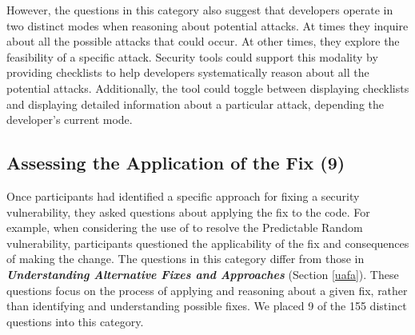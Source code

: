 \documentclass[conference]{IEEEtran}
\begin{document}
However, the questions in this category also suggest that developers operate in two distinct modes when reasoning about potential attacks.
At times they inquire about all the possible attacks that could occur.
At other times, they explore the feasibility of a specific attack.
Security tools could support this modality by providing checklists to help developers systematically reason about all the potential attacks. 
Additionally, the tool could toggle between displaying checklists and displaying detailed information about a particular attack, depending the developer's current mode.



\noindent\subsection{\textbf{Assessing the Application of the Fix (9)}}\label{aaf}
Once participants had identified a specific approach for fixing a security vulnerability, they asked questions about applying the fix to the code.
For example, when considering the use of  to resolve the Predictable Random vulnerability, participants questioned the applicability of the fix and consequences of making the change. 
The questions in this category differ from those in \emph{\textbf{Understanding Alternative Fixes and Approaches}} (Section \ref{uafa}). 
These questions focus on the process of applying  and reasoning about a given fix, rather than identifying and understanding possible fixes.
We placed 9 of the 155 distinct questions into this category.
\\
\end{document}
